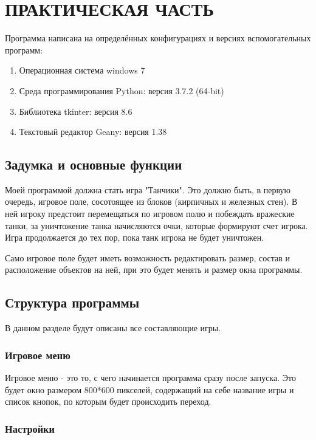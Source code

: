 \chapter{\label{ch:ch02}ПРАКТИЧЕСКАЯ ЧАСТЬ}

Программа написана на определённых конфигурациях и версиях вспомогательных программ:

\begin{enumerate}
\item Операционная система windows 7
\item Среда программирования Python: версия 3.7.2 (64-bit)
\item Библиотека tkinter: версия 8.6
\item Текстовый редактор Geany: версия 1.38
\end{enumerate}

\section{\label{sec:ch01/sec01}Задумка и основные функции}

Моей программой должна стать игра "Танчики". Это должно быть, в первую очередь, игровое поле, сосотоящее из блоков (кирпичных и железных стен). В ней игроку предстоит перемещаться по игровом полю и побеждать вражеские танки, за уничтожение танка начисляются очки, которые формируют счет игрока. Игра продолжается до тех пор, пока танк игрока не будет уничтожен.

Само игровое поле будет иметь возможность редактировать размер, состав и расположение объектов на ней, при это будет менять и размер окна программы.

\section{\label{sec:ch01/sec02}Структура программы}

В данном разделе будут описаны все составляющие игры.

\subsection{\label{sec:ch01/sec03/sub01}Игровое меню}

Игровое меню - это то, с чего начинается программа сразу после запуска. Это будет окно размером 800*600 пикселей, содержащий на себе название игры и список кнопок, по которым будет происходить переход.

\subsection{\label{sec:ch01/sec03/sub02}Настройки}

